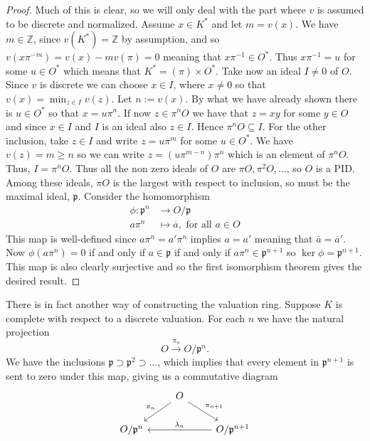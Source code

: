 \documentclass{article}
\newcommand{\mfrak}[1]{\mathfrak{#1}}
\newcommand{\mbb}[1]{\mathbb{#1}}
\begin{document}
\begin{proof}
    Much of this is clear, so we will only deal with the part where $v$ is assumed to be discrete and normalized. Assume $x \in K^*$ and let $m = v(x)$. We have $m \in \mbb Z$, since $v(K^*) = \mbb Z$ by assumption, and so $v(x \pi^{-m}) = v(x) - mv(\pi) = 0$ meaning that $x \pi^{-1} \in O^*$. Thus $x \pi^{-1} = u$ for some $u \in O^*$ which means that $K^* = (\pi) \times O^*$. Take now an ideal $I \neq 0$ of $O$. Since $v$ is discrete we can choose $x \in I$, where $x \neq 0$ so that $v(x) = \min_{z \in I}v(z)$. Let $n := v(x)$. By what we have already shown there is $u \in O^*$ so that $x = u\pi^n$. If now $z \in \pi^n O$ we have that $z = xy$ for some $y \in O$ and since $x \in I$ and $I$ is an ideal also $z \in I$. Hence $\pi^n O \subseteq I$. For the other inclusion, take $z \in I$ and write $z = u \pi^m$ for some $u \in O^*$. We have $v(z) = m \geq n$ so we can write $z = (u \pi^{m-n}) \pi^n$ which is an element of $\pi^n O$. Thus, $I = \pi^n O$. Thus all the non zero ideals of $O$ are $\pi O, \pi^2 O, ...$, so $O$ is a PID. Among these ideals, $\pi O$ is the largest with respect to inclusion, so must be the maximal ideal, $\mfrak p$. Consider the homomorphism 
    \begin{align*}
        \phi : \mfrak p^n &\to O / \mfrak p \\ 
        a \pi^n &\mapsto \overline a, \text{ for all } a \in O
    \end{align*}
    This map is well-defined since $a \pi^n = a' \pi^n$ implies $a = a'$ meaning that $\overline a = \overline a'$. Now $\phi(a \pi^n) = 0$ if and only if $a \in \mfrak p$ if and only if $a \pi^n \in \mfrak p^{n+1}$ so $\ker \phi = \mfrak p^{n+1}$. This map is also clearly surjective and so the first isomorphism theorem gives the desired result.
    
\end{proof}

There is in fact another way of constructing the valuation ring. Suppose $K$ is complete with respect to a discrete valuation. For each $n$ we have the natural projection 
$$O \xrightarrow{\pi_n} O / \mfrak p^n.$$ 
We have the inclusions $\mfrak p \supset \mfrak p^2 \supset ...$, which implies that every element in $\mfrak p^{n+1}$ is sent to zero under this map, giving us a commutative diagram
$$\begin{tikzcd}
    & O \arrow[ld, "\pi_{n}"'] \arrow[rd, "\pi_{n+1}"] & \\
    O / \mfrak p^{n} & & O / \mfrak p^{n+1} \arrow[ll, "\lambda_{n}"']
\end{tikzcd}$$
\end{document}
